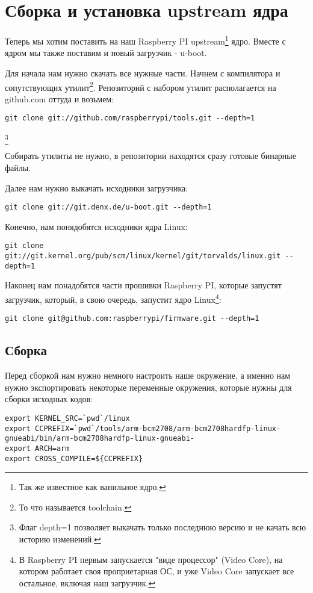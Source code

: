 \section{Сборка и установка upstream ядра}

Теперь мы хотим поставить на наш Raspberry PI upstream\footnote{Так же
известное как ванильное ядро.} ядро. Вместе с ядром мы также поставим и новый
загрузчик - u-boot.

Для начала нам нужно скачать все нужные части. Начнем с компилятора и
сопутствующих утилит\footnote{То что называется toolchain.}. Репозиторий с
набором утилит располагается на github.com оттуда и возьмем:
\begin{lstlisting}
git clone git://github.com/raspberrypi/tools.git --depth=1
\end{lstlisting}\footnote{Флаг \-\-depth=1 позволяет выкачать только последнюю
версию и не качать всю историю изменений.}

Собирать утилиты не нужно, в репозитории находятся сразу готовые бинарные файлы.

Далее нам нужно выкачать исходники загрузчика:
\begin{lstlisting}
git clone git://git.denx.de/u-boot.git --depth=1
\end{lstlisting}

Конечно, нам понядобятся исходники ядра Linux:
\begin{lstlisting}
git clone git://git.kernel.org/pub/scm/linux/kernel/git/torvalds/linux.git --depth=1
\end{lstlisting}

Наконец нам понадобятся части прошивки Raspberry PI, которые запустят загрузчик,
который, в свою очередь, запустит ядро Linux\footnote{В Raspberry PI первым
запускается "виде процессор" (Video Core), на котором работает своя
проприетарная ОС, и уже Video Core запускает все остальное, включая наш
загрузчик.}:
\begin{lstlisting}
git clone git@github.com:raspberrypi/firmware.git --depth=1
\end{lstlisting}

\subsection{Сборка}

Перед сборкой нам нужно немного настроить наше окружение, а именно нам нужно
экспортировать некоторые переменные окружения, которые нужны для сборки
исходных кодов:
\begin{lstlisting}
export KERNEL_SRC=`pwd`/linux
export CCPREFIX=`pwd`/tools/arm-bcm2708/arm-bcm2708hardfp-linux-gnueabi/bin/arm-bcm2708hardfp-linux-gnueabi-
export ARCH=arm
export CROSS_COMPILE=${CCPREFIX}
\end{lstlisting}

